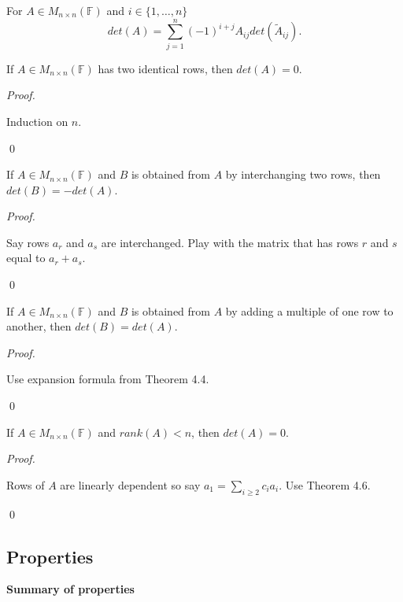 \documentclass[12pt]{article}
\newenvironment{theorem}[2][Theorem]{\begin{trivlist}
\item[\hskip \labelsep {\bfseries #1}\hskip \labelsep {\bfseries #2.}]}{\end{trivlist}}
\newenvironment{corollary}[2][Corollary]{\begin{trivlist}
\item[\hskip \labelsep {\bfseries #1}\hskip \labelsep {\bfseries #2}]}{\end{trivlist}}
\newenvironment{sol}
    {\emph{Proof.}
    }
    {
    \qed
    }
\begin{document}
\begin{theorem}{4.4}
For $A \in M_{n \times n}(\mathbb{F})$ and $i \in \{1, \dots, n\}$ $$det(A) = \sum_{j = 1}^n(-1)^{i + j}A_{ij}det(\tilde{A}_{ij}).$$
\end{theorem}

\begin{corollary}{7}
If $A \in M_{n \times n}(\mathbb{F})$ has two identical rows, then $det(A) = 0$.
\end{corollary}

\begin{sol}
Induction on $n$.
\end{sol}

\begin{theorem}{4.5}
If $A \in M_{n \times n}(\mathbb{F})$ and $B$ is obtained from $A$ by interchanging two rows, then $det(B) = -det(A)$.
\end{theorem}

\begin{sol}
Say rows $a_r$ and $a_s$ are interchanged. Play with the matrix that has rows $r$ and $s$ equal to $a_r + a_s$.
\end{sol}

\begin{theorem}{4.6}
If $A \in M_{n \times n}(\mathbb{F})$ and $B$ is obtained from $A$ by adding a multiple of one row to another, then $det(B) = det(A)$.
\end{theorem}

\begin{sol}
Use expansion formula from Theorem 4.4.
\end{sol}

\begin{corollary}{10}
If $A \in M_{n \times n}(\mathbb{F})$ and $rank(A) < n$, then $det(A) = 0$.
\end{corollary}

\begin{sol}
Rows of $A$ are linearly dependent so say $a_1 = \sum_{i \geq 2}c_ia_i$. Use Theorem 4.6.
\end{sol}

\subsection{Properties}

\textbf{Summary of properties}
\end{document}
